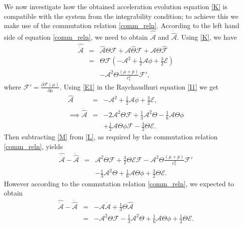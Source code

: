 \documentclass[abstract=on,notitlepage,superscriptaddress,nofootinbib,aps,showpacs,twocolumn,prd]{revtex4}
\newcommand{\0}{^{(0)}}
\newcommand{\1}{^{(1)}}
\newcommand{\2}{^{(2)}}
\newcommand{\3}{{}^{(3)}}
\begin{document}
We now investigate how the obtained acceleration evolution equation \eqref{K} is compatible with the system from the integrability condition; to achieve this we make use of the commutation relation \eqref{comm_reln}. According to the left hand side of equation \eqref{comm_reln}, we need to obtain $\hat{\dot{\mathcal{A}}}$ and $\dot{\hat{\mathcal{A}}}$. Using \eqref{K}, we have
\begin{eqnarray}
	 \hat{\dot{\mathcal{A}}} &=&\hat{\mathcal{A}}\Theta\mathcal{F}+\mathcal{A}\hat{\Theta}\mathcal{F}+\mathcal{A}\Theta\hat{\mathcal{F}}\nonumber \\
	&=&\Theta\mathcal{F}\left(-\mathcal{A}^2+\frac{1}{2}\mathcal{A}\phi+\frac{3}{2}\mathcal{E}\right)
	\nonumber\\ && -\mathcal{A}^2\Theta\frac{(\mu+p)}{c_s^2}\mathcal{F}', \label{L}
\end{eqnarray}
where $\mathcal{F}'=\frac{\partial \mathcal{F}(\mu)}{\partial \mu}$.
Using \eqref{E1} in the Raychaudhuri equation \eqref{I1} we get
\begin{eqnarray}
	\hat{\mathcal{A}}&=&-\mathcal{A}^2+\frac{1}{2}\mathcal{A}\phi+\frac{3}{2}\mathcal{E}, \nonumber \\
	\implies \dot{\hat{\mathcal{A}}} &=& -2\mathcal{A}^2\Theta\mathcal{F}+\frac{1}{3}\mathcal{A}^2\Theta-\frac{1}{6}\mathcal{A}\Theta\phi \nonumber\\ &&
	 +\frac{1}{2}\mathcal{A}\Theta\phi\mathcal{F}-\frac{3}{2}\Theta\mathcal{E}. \label{M} 
\end{eqnarray}
Then subtracting \eqref{M} from \eqref{L}, as required by the commutation relation \eqref{comm_reln}, yields
\begin{eqnarray}
	\hat{\dot{\mathcal{A}}}-\dot{\hat{\mathcal{A}}} &=&  \mathcal{A}^2\Theta\mathcal{F}+\frac{3}{2}\Theta\mathcal{E}\mathcal{F}  -\mathcal{A}^2\Theta\frac{(\mu+p)}{c_s^2}\mathcal{F}' \nonumber\\
	&&-\frac{1}{3}\mathcal{A}^2\Theta+\frac{1}{6}\mathcal{A}\Theta\phi+\frac{3}{2}\Theta\mathcal{E}.\label{N}
\end{eqnarray}
However according to the commutation relation \eqref{comm_reln}, we expected to obtain
\begin{eqnarray}
\hat{\dot{\mathcal{A}}}-\dot{\hat{\mathcal{A}}} &=& -\mathcal{A}\dot{\mathcal{A}}+\frac{1}{3}\Theta\hat{\mathcal{A}} \nonumber\\
	&=&-\mathcal{A}^2\Theta\mathcal{F}-\frac{1}{3}\mathcal{A}^2\Theta
	+\frac{1}{6}\mathcal{A}\Theta\phi +\frac{1}{2}\Theta\mathcal{E}.\label{O}
\end{eqnarray}
\end{document}
